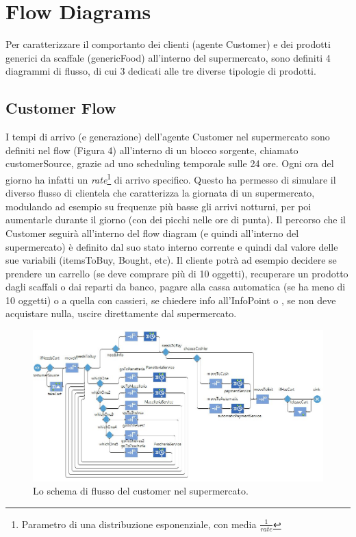 \documentclass{article}
\begin{document}
\section{Flow Diagrams}
Per caratterizzare il comportanto dei clienti (agente Customer) e dei prodotti generici da scaffale (genericFood) all'interno del supermercato, sono definiti 4 diagrammi di flusso, di cui 3 dedicati alle tre diverse tipologie di prodotti.
\subsection{Customer Flow}
I tempi di arrivo (e generazione) dell'agente Customer nel supermercato sono definiti nel flow (Figura 4) all'interno di un blocco sorgente, chiamato \textsf{customerSource}, grazie ad uno scheduling temporale sulle 24 ore. Ogni ora del giorno ha infatti un \textit{rate}\footnote{Parametro di una distribuzione esponenziale, con media $\frac{1}{rate} $ } di arrivo specifico. Questo ha permesso di simulare il diverso flusso di clientela che caratterizza la giornata di un supermercato, modulando ad esempio su frequenze più basse gli arrivi notturni, per poi aumentarle durante il giorno (con dei picchi nelle ore di punta).
\newline
\newline
Il percorso che il Customer seguirà all'interno del flow diagram (e quindi all'interno del supermercato) è definito dal suo stato interno corrente e quindi dal valore delle sue variabili (itemsToBuy, Bought, etc). Il cliente potrà ad esempio decidere se prendere un carrello (se deve comprare più di 10 oggetti), recuperare un prodotto dagli scaffali o dai reparti da banco, pagare alla cassa automatica (se ha meno di 10 oggetti) o a quella con cassieri, se chiedere info all'InfoPoint o , se non deve acquistare nulla, uscire direttamente dal supermercato.

\begin{center}
\begin{figure}[h]
\center
\label{custflow}
\includegraphics[scale=0.5]{./cust_flow.jpg}
\caption{\footnotesize{Lo schema di flusso del customer nel supermercato.}}
\end{figure}
\end{center}
\end{document}
